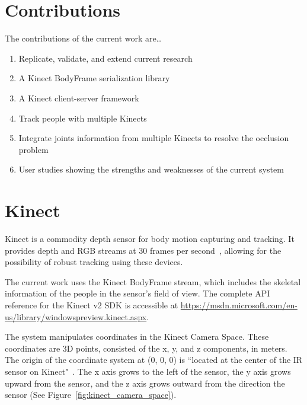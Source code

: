 \section{Contributions}
\label{sec:introduction_contributions}

The contributions of the current work are\ldots

\begin{enumerate}
  \item Replicate, validate, and extend current research
  \item A Kinect BodyFrame serialization library
  \item A Kinect client-server framework
  \item Track people with multiple Kinects
  \item Integrate joints information from multiple Kinects to resolve the occlusion problem
  \item User studies showing the strengths and weaknesses of the current system
\end{enumerate}

\section{Kinect}
\label{sec:introduction_kinect}

Kinect is a commodity depth sensor for body motion capturing and tracking. It provides depth and RGB streams at 30 frames per second~\cite{kinect_sensor_specs}, allowing for the possibility of robust tracking using these devices.

The current work uses the Kinect BodyFrame stream, which includes the skeletal information of the people in the sensor's field of view. The complete API reference for the Kinect v2 SDK is accessible at \url{https://msdn.microsoft.com/en-us/library/windowspreview.kinect.aspx}.

The system manipulates coordinates in the Kinect Camera Space. These coordinates are 3D points, consisted of the x, y, and z components, in meters. The origin of the coordinate system at (0, 0, 0) is ``located at the center of the IR sensor on Kinect"~\cite{microsoft_kinect_coordinates}. The x axis grows to the left of the sensor, the y axis grows upward from the sensor, and the z axis grows outward from the direction the sensor (See Figure~\ref{fig:kinect_camera_space}).



